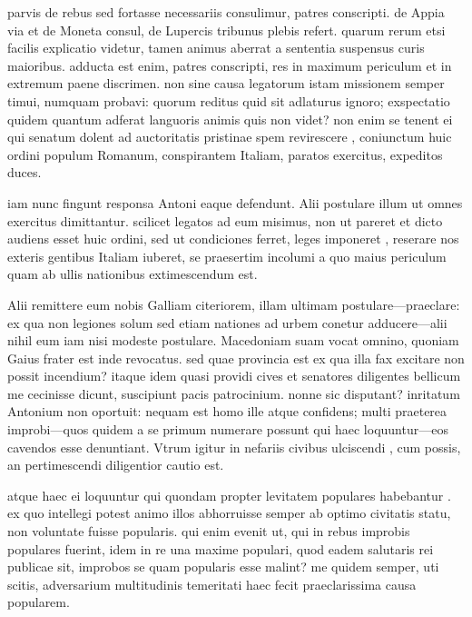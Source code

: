 
 parvis de rebus sed fortasse necessariis consulimur, patres conscripti. de Appia via et de Moneta consul, de Lupercis tribunus plebis refert. quarum rerum etsi facilis explicatio videtur, tamen animus aberrat a sententia suspensus curis maioribus. adducta est enim, patres conscripti, res in maximum periculum et in extremum paene discrimen. non sine causa legatorum istam missionem semper timui, numquam probavi: quorum reditus quid sit adlaturus ignoro; exspectatio quidem quantum adferat languoris animis quis non videt? non enim se tenent ei qui senatum dolent ad auctoritatis pristinae spem revirescere , coniunctum huic ordini populum Romanum, conspirantem Italiam, paratos exercitus, expeditos duces.

 iam nunc fingunt responsa Antoni eaque defendunt. Alii postulare illum ut omnes exercitus dimittantur. scilicet legatos ad eum misimus, non ut pareret et dicto audiens esset huic ordini, sed ut condiciones ferret, leges imponeret , reserare nos exteris gentibus Italiam iuberet, se praesertim incolumi a quo maius periculum quam ab ullis nationibus extimescendum est.

 Alii remittere eum nobis Galliam citeriorem, illam ultimam postulare—praeclare: ex qua non legiones solum sed etiam nationes ad urbem conetur adducere—alii nihil eum iam nisi modeste postulare. Macedoniam suam vocat omnino, quoniam Gaius frater est inde revocatus. sed quae provincia est ex qua illa fax excitare non possit incendium? itaque idem quasi providi cives et senatores diligentes bellicum me cecinisse dicunt, suscipiunt pacis patrocinium. nonne sic disputant? inritatum Antonium non oportuit: nequam est homo ille atque confidens; multi praeterea improbi—quos quidem a se primum numerare possunt qui haec loquuntur—eos cavendos esse denuntiant. Vtrum igitur in nefariis civibus ulciscendi , cum possis, an pertimescendi diligentior cautio est.

 atque haec ei loquuntur qui quondam propter levitatem populares habebantur . ex quo intellegi potest animo illos abhorruisse semper ab optimo civitatis statu, non voluntate fuisse popularis. qui enim evenit ut, qui in rebus improbis populares fuerint, idem in re una maxime populari, quod eadem salutaris rei publicae sit, improbos se quam popularis esse malint? me quidem semper, uti scitis, adversarium multitudinis temeritati haec fecit praeclarissima causa popularem.

